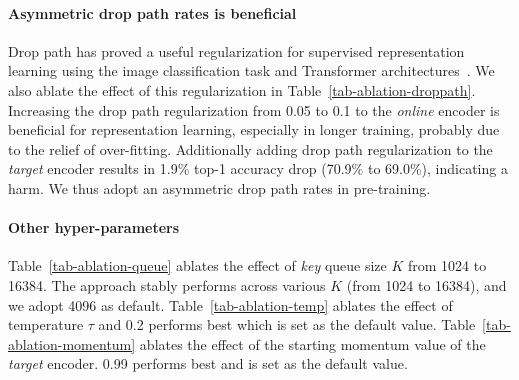 \documentclass{article}
\begin{document}
\paragraph{Asymmetric drop path rates is beneficial} Drop path has proved a useful regularization for supervised representation learning using the image classification task and Transformer architectures~\citep{deit,swin}. We also ablate the effect of this regularization in Table~\ref{tab-ablation-droppath}. Increasing the drop path regularization from 0.05 to 0.1 to the \emph{online} encoder is beneficial for representation learning, especially in longer training, probably due to the relief of over-fitting. Additionally adding drop path regularization to the \emph{target} encoder results in 1.9\% top-1 accuracy drop (70.9\% to 69.0\%), indicating a harm. We thus adopt an asymmetric drop path rates in pre-training.

\paragraph{Other hyper-parameters} Table~\ref{tab-ablation-queue} ablates the effect of \emph{key} queue size $K$ from 1024 to 16384. The approach stably performs across various $K$ (from 1024 to 16384), and we adopt 4096 as default.
Table~\ref{tab-ablation-temp} ablates the effect of temperature $\tau$ and 0.2 performs best which is set as the default value.
Table~\ref{tab-ablation-momentum} ablates the effect of the starting momentum value of the \emph{target} encoder. 0.99 performs best and is set as the default value.
\end{document}
